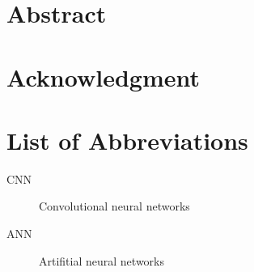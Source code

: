 \documentclass[a4paper, 12pt, oneside]{book}
\begin{document}
\frontmatter
\chapter*{Abstract}
\blindtext
{}
\nopagebreak

\chapter*{Acknowledgment}
\blindtext
{}

\tableofcontents
{}
\listoftables
{}
\listoffigures
{}

\chapter{List of Abbreviations}

\begin{description}

  \item[CNN] Convolutional neural networks
  \item[ANN] Artifitial neural networks

\end{description}

\mainmatter










\appendix
\clearpage
{}
\addappheadtotoc


\backmatter

\nocite{*}


\end{document}
